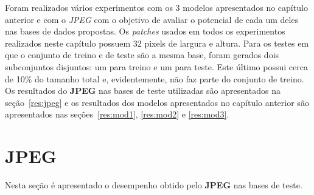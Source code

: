 Foram realizados vários experimentos com os 3 modelos apresentados no capítulo anterior e com o \textit{JPEG} com o objetivo de avaliar o potencial de cada um deles nas bases de dados propostas. Os \textit{patches} usados em todos os experimentos realizados neste capítulo possuem 32 pixels de largura e altura. Para os testes em que o conjunto de treino e de teste são a mesma base, foram gerados dois subconjuntos disjuntos: um para treino e um para teste. Este último possui cerca de 10\% do tamanho total e, evidentemente, não faz parte do conjunto de treino. Os resultados do \textbf{JPEG} nas bases de teste utilizadas são apresentados na seção~\ref{res:jpeg} e os resultados dos modelos apresentados no capítulo anterior são apresentados nas seções~\ref{res:mod1}, \ref{res:mod2} e \ref{res:mod3}.
\section{JPEG}
Nesta seção é apresentado o desempenho obtido pelo \textbf{JPEG} nas bases de teste. 
\label{res:jpeg}
